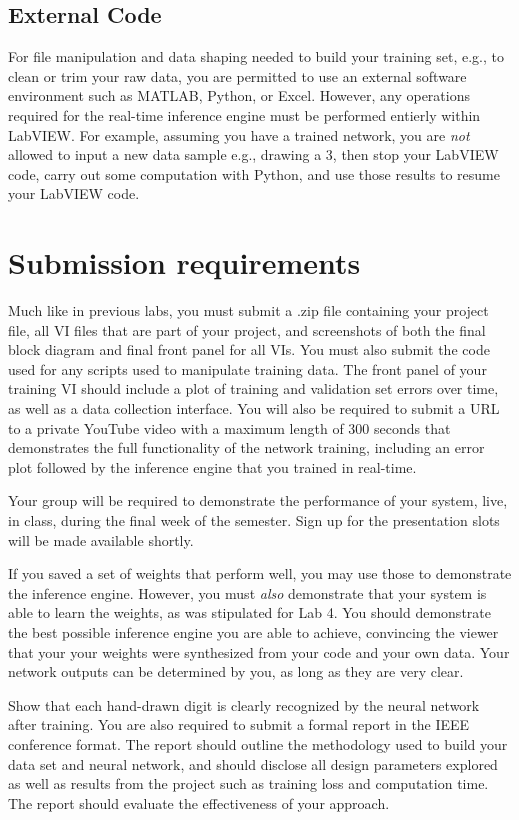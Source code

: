 \documentclass{article}
\begin{document}
\subsection{External Code}

For file manipulation and data shaping needed to build your training set, e.g., to clean or trim your raw data, you are permitted to use an external software environment such as MATLAB, Python, or Excel. However, any operations required for the real-time inference engine must be performed entierly within LabVIEW. For example, assuming you have a trained network, you are {\em not} allowed to input a new data sample e.g., drawing a 3, then stop your LabVIEW code, carry out some computation with Python, and use those results to resume your LabVIEW code.

\section{Submission requirements}

Much like in previous labs, you must submit a .zip file containing your project file, all VI files that are part of your project, and screenshots of both the final block diagram and final front panel for all VIs. You must also submit the code used for any scripts used to manipulate training data. The front panel of your training VI should include a plot of training and validation set errors over time, as well as a data collection interface. You will also be required to submit a URL to a private YouTube video with a maximum length of 300 seconds that demonstrates the full functionality of the network training, including an error plot followed by the inference engine that you trained in real-time.

Your group will be required to demonstrate the performance of your system, live, in class, during the final week of the semester.  Sign up for the presentation slots will be made available shortly.

If you saved a set of weights that perform well, you may use those to demonstrate the inference engine.  However, you must {\em also} demonstrate that your system is able to learn the weights, as was stipulated for Lab 4. %
You should demonstrate the best possible inference engine you are able to achieve, convincing the viewer that your your weights were synthesized from your code and your own data. Your network outputs can be determined by you, as long as they are very clear. 

Show that each hand-drawn digit is clearly recognized by the neural network after training. You are also required to submit a formal report in the IEEE conference format. The report should outline the methodology used to build your data set and neural network, and should disclose all design parameters explored as well as results from the project such as training loss and computation time. The report should evaluate the effectiveness of your approach.


\printbibliography

\onecolumn
\end{document}
